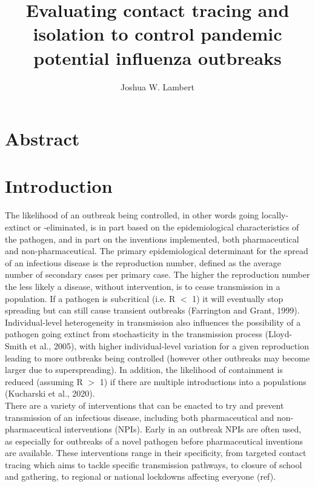 \documentclass{article}
\title{Evaluating contact tracing and isolation to control pandemic potential influenza outbreaks}
\author{Joshua W. Lambert}
\date{}
\begin{document}
\maketitle

\section{Abstract}

\section{Introduction}

The likelihood of an outbreak being controlled, in other words going locally-extinct or -eliminated, is in part based on the epidemiological characteristics of the pathogen, and in part on the inventions implemented, both pharmaceutical and non-pharmaceutical. The primary epidemiological determinant for the spread of an infectious disease is the reproduction number, defined as the average number of secondary cases  per primary case. The higher the reproduction number the less likely a disease, without intervention, is to cease transmission in a population. If a pathogen is subcritical (i.e. R $<$ 1) it will eventually stop spreading but can still cause transient outbreaks (Farrington and Grant, 1999). Individual-level heterogeneity in transmission also influences the possibility of a pathogen going extinct from stochasticity in the transmission process (Lloyd-Smith et al., 2005), with higher individual-level variation for a given reproduction leading to more outbreaks being controlled (however other outbreaks may become larger due to superspreading). In addition, the likelihood of containment is reduced (assuming R $>$ 1) if there are multiple introductions into a populations (Kucharski et al., 2020). \\

There are a variety of interventions that can be enacted to try and prevent transmission of an infectious disease, including both pharmaceutical and non-pharmaceutical interventions (NPIs). Early in an outbreak NPIs are often used, as especially for outbreaks of a novel pathogen before pharmaceutical inventions are available. These interventions range in their specificity, from targeted contact tracing which aims to tackle specific transmission pathways, to closure of school and gathering, to regional or national lockdowns affecting everyone (ref). \\
\end{document}
